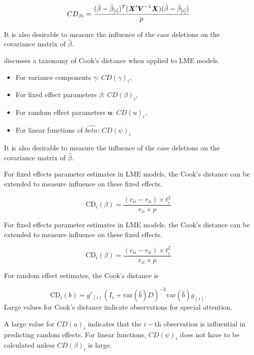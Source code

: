 \documentclass[12pt, a4paper]{report}
\theoremstyle{plain}
\theoremstyle{definition}
\theoremstyle{remark}
\begin{document}
 \[ CD_{\beta i} = {(\hat{\beta} - \hat{\beta}_{[i]})^{T}(\boldsymbol{X}^{\prime}\boldsymbol{V}^{-1}\boldsymbol{X}) (\hat{\beta} - \hat{\beta}_{[i]}) \over p}\]
 
 It is also desirable to measure the influence of the case deletions on the covariance matrix of $\hat{\beta}$.
 
		
\citet{schabenberger} discusses a taxonomy of Cook's distance when applied to LME models. \begin{itemize}
	\item For variance components $\gamma$: $CD(\gamma)_i$,
	\item For fixed effect parameters $\beta$: $CD(\beta)_i$,
	\item For random effect parameters $\boldsymbol{u}$: $CD(u)_i$,
	\item For linear functions of $\hat{beta}$: $CD(\psi)_i$
\end{itemize}			


It is also desirable to measure the influence of the case deletions on the covariance matrix of $\hat{\beta}$.

	For fixed effects parameter estimates in LME models, the  Cook's distance can be extended to measure influence on these fixed effects.
	
	\[
	\mbox{CD}_{i}(\beta) = \frac{(c_{ii} - r_{ii}) \times t^2_{i}}{r_{ii} \times p}
	\]
	

For fixed effects parameter estimates in LME models, the  Cook's distance can be extended to measure influence on these fixed effects.

\[
\mbox{CD}_{i}(\beta) = \frac{(c_{ii} - r_{ii}) \times t^2_{i}}{r_{ii} \times p}
\]
		
	For random effect estimates, the  Cook's distance is
	
	\[
	\mbox{CD}_{i}(b) = g{\prime}_{(i)} (I_{r} + \mbox{var}(\hat{b})D)^{-2}\mbox{var}(\hat{b})g_{(i)}.
	\]
Large values for Cook's distance indicate observations for special attention.

A large value for $CD(u)_i$ indicates that the $i-$th observation is influential in predicting random effects.
For linear functions, $CD(\psi)_i$ does not have to be calculated unless $CD(\beta)_i$ is large.
		
		
\end{document}
